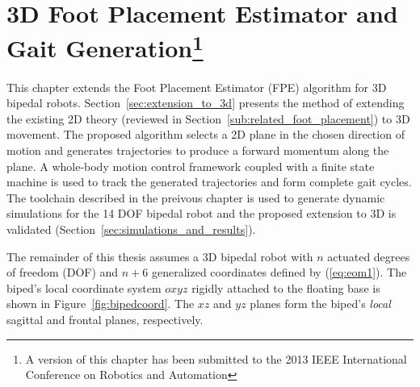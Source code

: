 \chapter[3D Foot Placement Estimator and Gait Generation]{3D Foot Placement Estimator and Gait Generation\footnote{A version of this chapter has been submitted to the 2013 IEEE International Conference on Robotics and Automation}} %
\label{cha:simulations}

This chapter extends the Foot Placement Estimator (FPE) algorithm for 3D bipedal robots. Section~\ref{sec:extension_to_3d} presents the method of extending the existing 2D theory (reviewed in Section~\ref{sub:related_foot_placement}) to 3D movement. The proposed algorithm selects a 2D plane in the chosen direction of motion and generates trajectories to produce a forward momentum along the plane. A whole-body motion control framework coupled with a finite state machine is used to track the generated trajectories and form complete gait cycles. The toolchain described in the preivous chapter is used to generate dynamic simulations for the 14 DOF bipedal robot and the proposed extension to 3D is validated (Section~\ref{sec:simulations_and_results}).

The remainder of this thesis assumes a 3D bipedal robot with $n$ actuated degrees of freedom (DOF) and $n+6$ generalized coordinates defined by (\ref{eq:eom1}). The biped's local coordinate system $oxyz$ rigidly attached to the floating base is shown in Figure~\ref{fig:bipedcoord}. The $xz$ and $yz$ planes form the biped's \emph{local} sagittal and frontal planes, respectively. 

